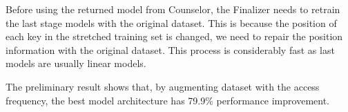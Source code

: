 \begin{bigabstract}
Before using the returned model from Counselor, the Finalizer needs to retrain the last stage models with the original dataset.
This is because the position of each key in the stretched training set is changed, we need to repair the position information with the original dataset.
This process is considerably fast as last models are usually linear models.

The preliminary result shows that, by augmenting dataset with the access frequency, the best model architecture has 79.9\% performance improvement.

\end{bigabstract}